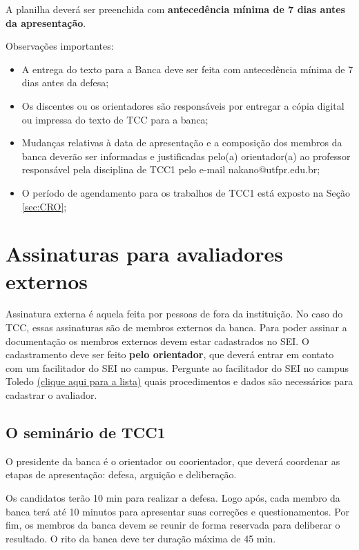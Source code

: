 \documentclass[a4paper, 12pt]{article}
\begin{document}
    A planilha deverá ser preenchida com \textbf{antecedência mínima de 7 dias antes da apresentação}.    
		
    Observações importantes:
    
    \begin{itemize}
    	\item A entrega do texto para a Banca deve ser feita com antecedência mínima de 7 dias antes da defesa;
    	\item Os discentes ou os orientadores são responsáveis por entregar a cópia digital ou impressa do texto de TCC para a banca;
    	\item Mudanças relativas à data de apresentação e a composição dos membros da banca deverão ser informadas e justificadas pelo(a) orientador(a) ao professor responsável pela disciplina de TCC1 pelo e-mail nakano@utfpr.edu.br;
    	\item O período de agendamento para os trabalhos de TCC1 está exposto na Seção \ref{sec:CRO};
    \end{itemize}

	\section{Assinaturas para avaliadores externos}
	
	Assinatura externa é aquela feita por pessoas de fora da instituição. No caso do TCC, essas assinaturas são de membros externos da banca. Para poder assinar a documentação os membros externos devem estar cadastrados no SEI. O cadastramento deve ser feito \textbf{pelo orientador}, que deverá entrar em contato com um facilitador do SEI no campus. Pergunte ao facilitador do SEI no campus Toledo \href{http://portal.utfpr.edu.br/servidores/servicos-servidor/sei/facilitadores}{(clique aqui para a lista)} quais procedimentos e dados são necessários para cadastrar o avaliador.

	\subsection{O seminário de TCC1}
	
	O presidente da banca é o orientador ou coorientador, que deverá coordenar as etapas de apresentação: defesa, arguição e deliberação. 
	
	Os candidatos terão 10 min para realizar a defesa. Logo após, cada membro da banca terá até 10 minutos para apresentar suas correções e questionamentos. Por fim, os membros da banca devem se reunir de forma reservada para deliberar o resultado. O rito da banca deve ter duração máxima de 45 min.	
\end{document}
